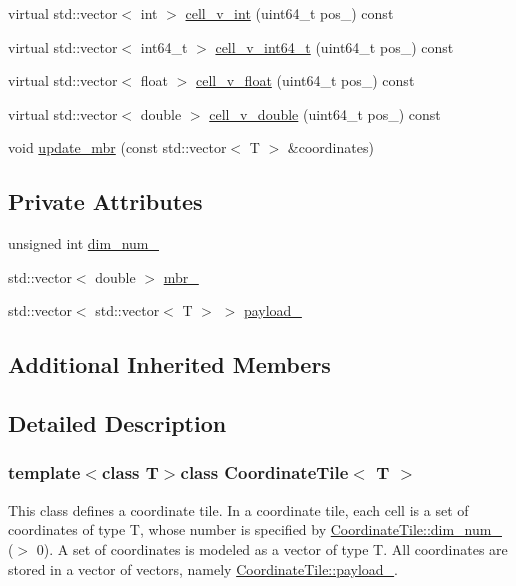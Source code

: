 \begin{DoxyCompactItemize}
virtual std\+::vector$<$ int $>$ \hyperlink{classCoordinateTile_af30cbd799740bfd0d1f8f773f186fb8d}{cell\+\_\+v\+\_\+int} (uint64\+\_\+t pos\+\_\+) const 
\item 
virtual std\+::vector$<$ int64\+\_\+t $>$ \hyperlink{classCoordinateTile_a4a9268bd183262dae62be587da03fa71}{cell\+\_\+v\+\_\+int64\+\_\+t} (uint64\+\_\+t pos\+\_\+) const 
\item 
virtual std\+::vector$<$ float $>$ \hyperlink{classCoordinateTile_a469ad049834b15ac8ae8f0cd52a7be79}{cell\+\_\+v\+\_\+float} (uint64\+\_\+t pos\+\_\+) const 
\item 
virtual std\+::vector$<$ double $>$ \hyperlink{classCoordinateTile_adb236c3bcfab13653a6799fe81fae917}{cell\+\_\+v\+\_\+double} (uint64\+\_\+t pos\+\_\+) const 
\item 
void \hyperlink{classCoordinateTile_ad8816e9a5481b0993b4f687f86b8938b}{update\+\_\+mbr} (const std\+::vector$<$ T $>$ \&coordinates)
\end{DoxyCompactItemize}
\subsection*{Private Attributes}
\begin{DoxyCompactItemize}
\item 
unsigned int \hyperlink{classCoordinateTile_a1c4f8a58ab5a9848463901280d91fe54}{dim\+\_\+num\+\_\+}
\item 
std\+::vector$<$ double $>$ \hyperlink{classCoordinateTile_adfff0b1c24ab71f4d67784efff84ce68}{mbr\+\_\+}
\item 
std\+::vector$<$ std\+::vector$<$ T $>$ $>$ \hyperlink{classCoordinateTile_a3c8f3045b9d989d2a4313fb65b23e48d}{payload\+\_\+}
\end{DoxyCompactItemize}
\subsection*{Additional Inherited Members}


\subsection{Detailed Description}
\subsubsection*{template$<$class T$>$class Coordinate\+Tile$<$ T $>$}

This class defines a coordinate tile. In a coordinate tile, each cell is a set of coordinates of type T, whose number is specified by \hyperlink{classCoordinateTile_a1c4f8a58ab5a9848463901280d91fe54}{Coordinate\+Tile\+::dim\+\_\+num\+\_\+} ($>$ 0). A set of coordinates is modeled as a vector of type T. All coordinates are stored in a vector of vectors, namely \hyperlink{classCoordinateTile_a3c8f3045b9d989d2a4313fb65b23e48d}{Coordinate\+Tile\+::payload\+\_\+}.

